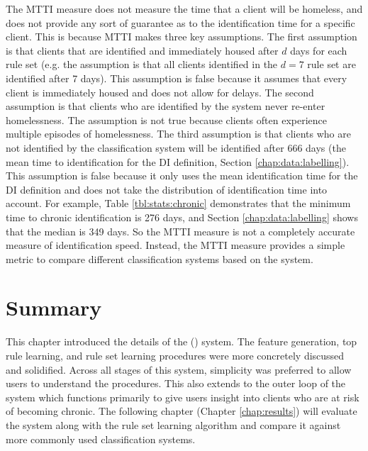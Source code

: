 The MTTI measure does not measure the time that a client will be homeless, and does not provide any sort of guarantee as to the identification time for a specific client.
This is because MTTI makes three key assumptions. The first assumption is that clients that are identified and immediately housed after $d$ days for each rule set (e.g. the assumption is that all clients identified in the $d=7$ rule set are identified after 7 days). This assumption is false because it assumes that every client is immediately housed and does not allow for delays.
The second assumption is that clients who are identified by the system never re-enter homelessness. The assumption is not true because clients often experience multiple episodes of homelessness.
The third assumption is that clients who are not identified by the classification system will be identified after 666 days (the mean time to identification for the DI definition, Section \ref{chap:data:labelling}). This assumption is false because it only uses the mean identification time for the DI definition and does not take the distribution of identification time into account. For example, Table \ref{tbl:stats:chronic} demonstrates that the minimum time to chronic identification is 276 days, and Section \ref{chap:data:labelling} shows that the median is 349 days.
So the MTTI measure is not a completely accurate measure of identification speed. Instead, the MTTI measure provides a simple metric to compare different classification systems based on the \Abb system.


\section{Summary}

This chapter introduced the details of the \Name (\Abb) system. The feature generation, top rule learning, and rule set learning procedures were more concretely discussed and solidified. Across all stages of this system, simplicity was preferred to allow users to understand the procedures. This also extends to the outer loop of the \Abb system which functions primarily to give users insight into clients who are at risk of becoming chronic. The following chapter (Chapter \ref{chap:results}) will evaluate the \Abb system along with the \Abb rule set learning algorithm and compare it against more commonly used classification systems.

